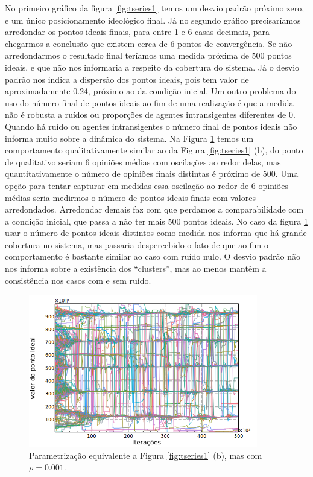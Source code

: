     No primeiro gráfico da figura \ref{fig:tseries1} temos um desvio padrão
    próximo zero, e um único posicionamento ideológico final. Já no segundo
    gráfico precisaríamos arredondar os pontos ideais finais, para entre 1 e 6
    casas decimais, para chegarmos a conclusão que existem cerca de 6 pontos de
    convergência. Se não arredondarmos o resultado final teríamos uma medida
    próxima de 500 pontos ideais, e que não nos informaria a respeito da
    cobertura do sistema. Já o desvio padrão nos indica a dispersão dos pontos
    ideais, pois tem valor de aproximadamente 0.24, próximo ao da condição
    inicial. Um outro problema do uso do número final de pontos ideais ao fim de
    uma realização é que a medida não é robusta a ruídos ou proporções de
    agentes intransigentes diferentes de 0. Quando há ruído ou agentes
    intransigentes o número final de pontos ideais não informa muito sobre a
    dinâmica do sistema. Na Figura \ref{fig:nonnullrho} temos um comportamento
    qualitativamente similar ao da Figura \ref{fig:tseries1} (b), do ponto de
    qualitativo seriam 6 opiniões médias com oscilações ao redor delas, mas
    quantitativamente o número de opiniões finais distintas é próximo de 500.
    Uma opção para tentar capturar em medidas essa oscilação ao redor de 6
    opiniões médias seria medirmos o número de pontos ideais finais com valores
    arredondados. Arredondar demais faz com que perdamos a comparabilidade com a
    condição inicial, que passa a não ter mais 500 pontos ideais. No caso da
    figura \ref{fig:nonnullrho} usar o número de pontos ideais distintos como
    medida nos informa que há grande cobertura no sistema, mas passaria
    despercebido o fato de que ao fim o comportamento é bastante similar ao caso
    com ruído nulo. O desvio padrão não nos informa sobre a existência dos
    ``clusters'', mas ao menos mantêm a consistência nos casos com e sem ruído.
    
  \begin{figure}[H]
    \centering
    \includegraphics[width =10cm]{ims/ts5.png}
    \caption{Parametrização equivalente a Figura \ref{fig:tseries1} (b),
      mas com \(\rho = 0.001\).}
    \label{fig:nonnullrho}
  \end{figure}

